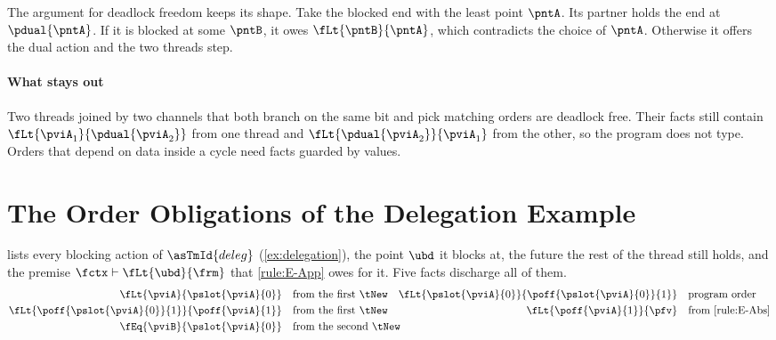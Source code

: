 The argument for deadlock freedom keeps its shape. Take the blocked end
with the least point $\pntA$. Its partner holds the end at
$\pdual{\pntA}$. If it is blocked at some $\pntB$, it owes
$\fLt{\pntB}{\pntA}$, which contradicts the choice of $\pntA$. Otherwise
it offers the dual action and the two threads step.

\paragraph{What stays out}
Two threads joined by two channels that both branch on the same bit and
pick matching orders are deadlock free. Their facts still contain
$\fLt{\pviA_1}{\pdual{\pviA_2}}$ from one thread and
$\fLt{\pdual{\pviA_2}}{\pviA_1}$ from the other, so the program does not
type. Orders that depend on data inside a cycle need facts guarded by
values.



\section{The Order Obligations of the Delegation Example}
\label{sec:app-delegation}

 lists every blocking action of $\asTmId{deleg}$
(\cref{ex:delegation}), the point $\ubd$ it blocks at, the future the rest
of the thread still holds, and the premise
$\fctx \types \fLt{\ubd}{\frm}$ that \ref{rule:E-App} owes for it. Five
facts discharge all of them.
\begin{align*}
  \fLt{\pviA}{\pslot{\pviA}{0}} &\quad\text{from the first } \tNew
  &
  \fLt{\pslot{\pviA}{0}}{\poff{\pslot{\pviA}{0}}{1}} &\quad\text{program order}
  \\
  \fLt{\poff{\pslot{\pviA}{0}}{1}}{\poff{\pviA}{1}} &\quad\text{from the first } \tNew
  &
  \fLt{\poff{\pviA}{1}}{\pfv} &\quad\text{from \ref{rule:E-Abs}}
  \\
  \fEq{\pviB}{\pslot{\pviA}{0}} &\quad\text{from the second } \tNew
  \span\span
\end{align*}

